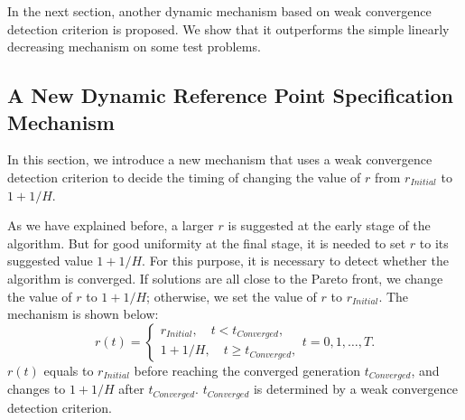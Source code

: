 \documentclass[conference]{IEEEtran}
\begin{document}
In the next section, another dynamic mechanism based on weak convergence detection criterion is proposed. 
We show that it outperforms the simple linearly decreasing mechanism on some test problems. 

% 
\subsection{A New Dynamic Reference Point Specification Mechanism}
In this section,
we introduce a new mechanism that uses a weak convergence detection criterion to 
decide the timing of changing the value of $r$ from $r_{Initial}$ to $1+1/H$. 

As we have explained before, 
a larger $r$ is suggested at the early stage of the algorithm. 
But for good uniformity at the final stage,
it is needed to set $r$ to its suggested value $1+1/H$. 
For this purpose, it is necessary to detect whether the algorithm is converged. 
If solutions are all close to the Pareto front, 
we change the value of $r$ to $1+1/H$; otherwise, we set the value of $r$ to 
$r_{Initial}$. The mechanism is shown below:
\begin{equation}\label{endm1}
  r(t)=
  \begin{cases}
    r_{Initial}, \quad t<t_{Converged},\\
    1+1/H, \quad t \ge t_{Converged}, 
  \end{cases} 
  t=0,1,\dots,T.
\end{equation}
$r(t)$ equals to $r_{Initial}$ before reaching the converged generation $t_{Converged}$, 
and changes to $1+1/H$ after $t_{Converged}$. 
$t_{Converged}$ is determined by a weak convergence detection criterion. 
\end{document}
